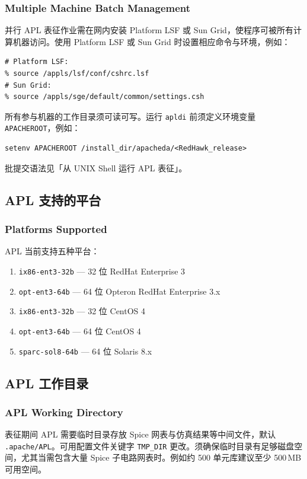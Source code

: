 \subsubsection*{Multiple Machine Batch Management}

并行 APL 表征作业需在网内安装 Platform LSF 或 Sun Grid，使程序可被所有计算机器访问。使用 Platform LSF 或 Sun Grid 时设置相应命令与环境，例如：
\begin{lstlisting}
# Platform LSF:
% source /appls/lsf/conf/cshrc.lsf
# Sun Grid:
% source /appls/sge/default/common/settings.csh
\end{lstlisting}

所有参与机器的工作目录须可读可写。运行 \texttt{apldi} 前须定义环境变量 \texttt{APACHEROOT}，例如：
\begin{lstlisting}
setenv APACHEROOT /install_dir/apacheda/<RedHawk_release>
\end{lstlisting}
批提交语法见「从 UNIX Shell 运行 APL 表征」。

\subsection{APL 支持的平台}
\subsubsection*{Platforms Supported}

APL 当前支持五种平台：
\begin{enumerate}
  \item \texttt{ix86-ent3-32b} — 32 位 RedHat Enterprise 3
  \item \texttt{opt-ent3-64b} — 64 位 Opteron RedHat Enterprise 3.x
  \item \texttt{ix86-ent3-32b} — 32 位 CentOS 4
  \item \texttt{opt-ent3-64b} — 64 位 CentOS 4
  \item \texttt{sparc-sol8-64b} — 64 位 Solaris 8.x
\end{enumerate}

\subsection{APL 工作目录}
\subsubsection*{APL Working Directory}

表征期间 APL 需要临时目录存放 Spice 网表与仿真结果等中间文件，默认 \texttt{.apache/APL}。可用配置文件关键字 \texttt{TMP\_DIR} 更改。须确保临时目录有足够磁盘空间，尤其当需包含大量 Spice 子电路网表时。例如约 500 单元库建议至少 500\,MB 可用空间。


